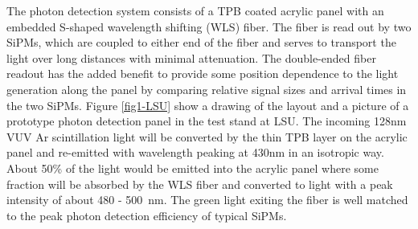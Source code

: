 The photon detection system consists of a TPB coated acrylic panel
with an embedded S-shaped wavelength shifting (WLS) fiber. The fiber
is read out by two SiPMs, which are coupled to either end of the fiber
and serves to transport the light over long distances with minimal
attenuation. The double-ended fiber readout has the added benefit to
provide some position dependence to the light generation along the
panel by comparing relative signal sizes and arrival times in the two
SiPMs. Figure \ref{fig1-LSU} show a drawing of the layout and a
picture of a prototype photon detection panel in the test stand at
LSU.  The incoming 128nm VUV Ar scintillation light will be converted
by the thin TPB layer on the acrylic panel and re-emitted with
wavelength peaking at 430nm in an isotropic way. About 50\% of the
light would be emitted into the acrylic panel where some fraction will
be absorbed by the WLS fiber and converted to light with a peak
intensity of about 480 - 500~nm. The green light exiting the fiber is
well matched to the peak photon detection efficiency of typical SiPMs.
%
